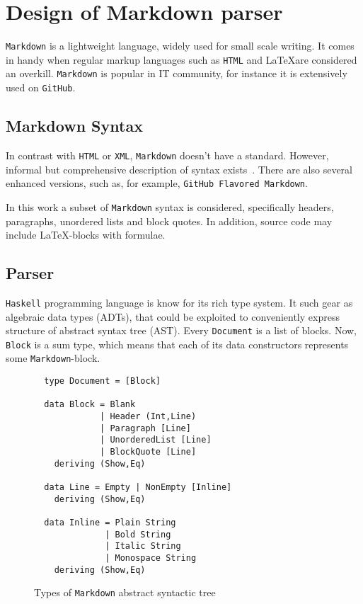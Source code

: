 
\chapter{Design of Markdown parser}

\lstinline{Markdown} is a lightweight language, widely used for small scale 
writing. It comes in handy when regular markup languages such as 
\lstinline{HTML} and \LaTeX are considered an overkill. \lstinline{Markdown}
is popular in IT community, for instance it is extensively used on 
\lstinline{GitHub}.

\section{Markdown Syntax}

  In contrast with \lstinline{HTML} or \lstinline{XML}, \lstinline{Markdown}
  doesn't have a standard. However, informal but comprehensive description of 
  syntax exists~\cite{markdownSyntax}. There are also several enhanced versions, 
  such as, for example, \lstinline{GitHub Flavored Markdown}.

  In this work a subset of \lstinline{Markdown} syntax is considered, 
  specifically headers, paragraphs, unordered lists and block quotes. In addition, 
  source code may include \LaTeX-blocks with formulae.   

\section{Parser}

  \lstinline{Haskell} programming language is know for its rich type system. It
  such gear as algebraic data types (ADTs), that could be exploited to conveniently 
  express structure of abstract syntax tree (AST). Every 
  \lstinline{Document} is a list of blocks. Now, 
  \lstinline{Block} is a sum type, which means that each of its data constructors 
  represents some \lstinline{Markdown}-block.     

  \begin{figure}[t]
  \begin{lstlisting}
  type Document = [Block]

  data Block = Blank
             | Header (Int,Line)
             | Paragraph [Line]
             | UnorderedList [Line]
             | BlockQuote [Line]
    deriving (Show,Eq)

  data Line = Empty | NonEmpty [Inline]
    deriving (Show,Eq)

  data Inline = Plain String
              | Bold String
              | Italic String
              | Monospace String
    deriving (Show,Eq)
  \end{lstlisting}
  \caption{Types of \lstinline{Markdown} abstract syntactic tree}
  \label{listing:MarkdownADT}
  \end{figure}

